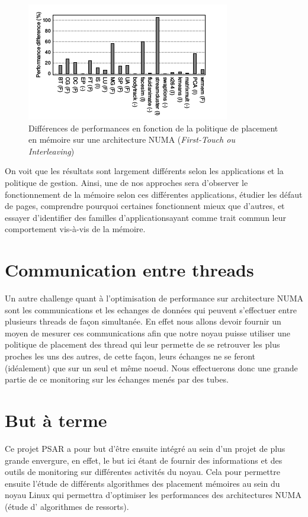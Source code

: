     \begin{figure}[!h]
      \centering
      \includegraphics[scale=0.65]{img/numa_memory_policy}
      \caption{Différences de performances en fonction de la politique de
        placement en mémoire sur une architecture NUMA (\textit{First-Touch ou Interleaving})}
    \end{figure}

    On voit que les résultats sont largement différents selon les applications
    et la politique de gestion. Ainsi, une de nos approches sera d'observer le
    fonctionnement de la mémoire selon ces différentes applications, étudier les
    défaut de pages, comprendre pourquoi certaines fonctionnent mieux que
    d'autres, et essayer d'identifier des \og familles d'applications\fg ayant
    comme trait commun leur comportement vis-à-vis de la mémoire.
    
  \section{Communication entre threads}
    
    Un autre challenge quant à l'optimisation de performance sur architecture 
    NUMA sont les communications et les echanges de données qui peuvent s'effectuer entre 
    plusieurs threads de façon simultanée. En effet nous allons devoir fournir un moyen
    de mesurer ces communications afin que notre noyau 
    puisse utiliser une politique de placement des thread qui leur permette de 
    se retrouver les plus proches les uns des autres, de cette façon, leurs échanges 
    ne se feront (idéalement) que sur un seul et même noeud. Nous effectuerons donc
    une grande partie de ce monitoring sur les échanges menés par des tubes.

  \section{But à terme}

    Ce projet PSAR a pour but d'être ensuite intégré au sein d'un projet de plus grande 
    envergure, en effet, le but ici étant de fournir des informations et des outils
    de monitoring sur différentes activités du noyau. Cela pour permettre ensuite 
    l'étude de différents algorithmes des placement mémoires au sein du noyau Linux
    qui permettra d'optimiser les performances des architectures NUMA (étude d'
    algorithmes de \og ressorts\fg).
